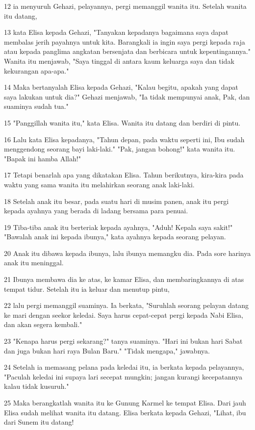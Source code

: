 \par 12 ia menyuruh Gehazi, pelayannya, pergi memanggil wanita itu. Setelah wanita itu datang,
\par 13 kata Elisa kepada Gehazi, "Tanyakan kepadanya bagaimana saya dapat membalas jerih payahnya untuk kita. Barangkali ia ingin saya pergi kepada raja atau kepada panglima angkatan bersenjata dan berbicara untuk kepentingannya." Wanita itu menjawab, "Saya tinggal di antara kaum keluarga saya dan tidak kekurangan apa-apa."
\par 14 Maka bertanyalah Elisa kepada Gehazi, "Kalau begitu, apakah yang dapat saya lakukan untuk dia?" Gehazi menjawab, "Ia tidak mempunyai anak, Pak, dan suaminya sudah tua."
\par 15 "Panggillah wanita itu," kata Elisa. Wanita itu datang dan berdiri di pintu.
\par 16 Lalu kata Elisa kepadanya, "Tahun depan, pada waktu seperti ini, Ibu sudah menggendong seorang bayi laki-laki." "Pak, jangan bohong!" kata wanita itu. "Bapak ini hamba Allah!"
\par 17 Tetapi benarlah apa yang dikatakan Elisa. Tahun berikutnya, kira-kira pada waktu yang sama wanita itu melahirkan seorang anak laki-laki.
\par 18 Setelah anak itu besar, pada suatu hari di musim panen, anak itu pergi kepada ayahnya yang berada di ladang bersama para penuai.
\par 19 Tiba-tiba anak itu berteriak kepada ayahnya, "Aduh! Kepala saya sakit!" "Bawalah anak ini kepada ibunya," kata ayahnya kepada seorang pelayan.
\par 20 Anak itu dibawa kepada ibunya, lalu ibunya memangku dia. Pada sore harinya anak itu meninggal.
\par 21 Ibunya membawa dia ke atas, ke kamar Elisa, dan membaringkannya di atas tempat tidur. Setelah itu ia keluar dan menutup pintu,
\par 22 lalu pergi memanggil suaminya. Ia berkata, "Suruhlah seorang pelayan datang ke mari dengan seekor keledai. Saya harus cepat-cepat pergi kepada Nabi Elisa, dan akan segera kembali."
\par 23 "Kenapa harus pergi sekarang?" tanya suaminya. "Hari ini bukan hari Sabat dan juga bukan hari raya Bulan Baru." "Tidak mengapa," jawabnya.
\par 24 Setelah ia memasang pelana pada keledai itu, ia berkata kepada pelayannya, "Paculah keledai ini supaya lari secepat mungkin; jangan kurangi kecepatannya kalau tidak kusuruh."
\par 25 Maka berangkatlah wanita itu ke Gunung Karmel ke tempat Elisa. Dari jauh Elisa sudah melihat wanita itu datang. Elisa berkata kepada Gehazi, "Lihat, ibu dari Sunem itu datang!
